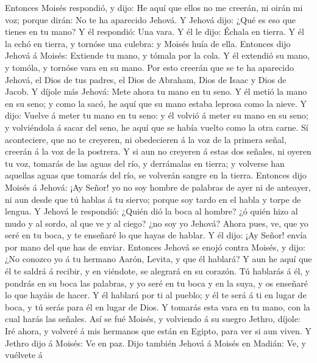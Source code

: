  Entonces Moisés respondió, y dijo: He aquí que ellos no
me creerán, ni oirán mi voz; porque dirán: No te ha aparecido Jehová.
 Y Jehová dijo: ¿Qué es eso que tienes en tu mano? Y él
respondió: Una vara.  Y él le dijo: Échala en tierra. Y él
la echó en tierra, y tornóse una culebra: y Moisés huía de ella.
 Entonces dijo Jehová á Moisés: Extiende tu mano, y tómala
por la cola. Y él extendió su mano, y tomóla, y tornóse vara en su mano.
 Por esto creerán que se te ha aparecido Jehová, el Dios
de tus padres, el Dios de Abraham, Dios de Isaac y Dios de Jacob.
 Y díjole más Jehová: Mete ahora tu mano en tu seno. Y él
metió la mano en su seno; y como la sacó, he aquí que su mano estaba
leprosa como la nieve.  Y dijo: Vuelve á meter tu mano en
tu seno: y él volvió á meter su mano en su seno; y volviéndola á sacar
del seno, he aquí que se había vuelto como la otra carne. 
Sí aconteciere, que no te creyeren, ni obedecieren á la voz de la
primera señal, creerán á la voz de la postrera.  Y si aun
no creyeren á estas dos señales, ni oyeren tu voz, tomarás de las aguas
del río, y derrámalas en tierra; y volverse han aquellas aguas que
tomarás del río, se volverán sangre en la tierra. 
Entonces dijo Moisés á Jehová: ¡Ay Señor! yo no soy hombre de palabras
de ayer ni de anteayer, ni aun desde que tú hablas á tu siervo; porque
soy tardo en el habla y torpe de lengua.  Y Jehová le
respondió: ¿Quién dió la boca al hombre? ¿ó quién hizo al mudo y al
sordo, al que ve y al ciego? ¿no soy yo Jehová?  Ahora
pues, ve, que yo seré en tu boca, y te enseñaré lo que hayas de hablar.
 Y él dijo: ¡Ay Señor! envía por mano del que has de
enviar.  Entonces Jehová se enojó contra Moisés, y dijo:
¿No conozco yo á tu hermano Aarón, Levita, y que él hablará? Y aun he
aquí que él te saldrá á recibir, y en viéndote, se alegrará en su
corazón.  Tú hablarás á él, y pondrás en su boca las
palabras, y yo seré en tu boca y en la suya, y os enseñaré lo que hayáis
de hacer.  Y él hablará por ti al pueblo; y él te será á
ti en lugar de boca, y tú serás para él en lugar de Dios.
 Y tomarás esta vara en tu mano, con la cual harás las
señales.  Así se fué Moisés, y volviendo á su suegro
Jethro, díjole: Iré ahora, y volveré á mis hermanos que están en Egipto,
para ver si aun viven. Y Jethro dijo á Moisés: Ve en paz.
 Dijo también Jehová á Moisés en Madián: Ve, y vuélvete á
